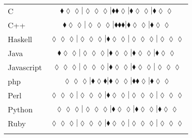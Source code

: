 \begin{table*}
{\begin{tabular}{l c}
C & $\scriptscriptstyle\blacklozenge\lozenge\lozenge|\lozenge\lozenge\lozenge|\blacklozenge\blacklozenge\lozenge|\blacklozenge\lozenge\lozenge|\blacklozenge\lozenge\lozenge$ \\
C++ & $\scriptscriptstyle\blacklozenge\lozenge\lozenge|\lozenge\lozenge\lozenge|\blacklozenge\blacklozenge\blacklozenge|\blacklozenge\lozenge\lozenge|\blacklozenge\lozenge\lozenge$ \\
Haskell & $\scriptscriptstyle\lozenge\lozenge\lozenge|\lozenge\lozenge\lozenge|\blacklozenge\lozenge\lozenge|\lozenge\lozenge\lozenge|\lozenge\lozenge\lozenge$ \\
Java & $\scriptscriptstyle\blacklozenge\lozenge\lozenge|\lozenge\lozenge\lozenge|\blacklozenge\lozenge\lozenge|\blacklozenge\lozenge\lozenge|\blacklozenge\lozenge\lozenge$ \\
Javascript & $\scriptscriptstyle\lozenge\lozenge\lozenge|\lozenge\lozenge\lozenge|\blacklozenge\lozenge\lozenge|\blacklozenge\lozenge\lozenge|\lozenge\lozenge\lozenge$ \\
{\sc php} & $\scriptscriptstyle\lozenge\lozenge\lozenge|\blacklozenge\lozenge\blacklozenge|\blacklozenge\lozenge\lozenge|\blacklozenge\blacklozenge\lozenge|\blacklozenge\lozenge\lozenge$ \\
Perl & $\scriptscriptstyle\lozenge\lozenge\lozenge|\lozenge\lozenge\lozenge|\blacklozenge\lozenge\lozenge|\lozenge\lozenge\lozenge|\lozenge\lozenge\lozenge$ \\
Python & $\scriptscriptstyle\lozenge\lozenge\lozenge|\lozenge\lozenge\lozenge|\blacklozenge\lozenge\lozenge|\blacklozenge\lozenge\lozenge|\blacklozenge\lozenge\lozenge$ \\
Ruby & $\scriptscriptstyle\lozenge\lozenge\lozenge|\lozenge\lozenge\lozenge|\blacklozenge\lozenge\lozenge|\lozenge\lozenge\lozenge|\lozenge\lozenge\lozenge$ \\

\hline
& \\
\end{tabular}
} 
\end{table*}
